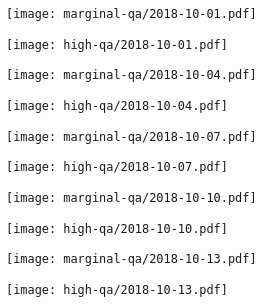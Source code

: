 \documentclass{article}
\begin{document}
\begin{figure}[H]
	\ContinuedFloat
	\centering
	\begin{subfigure}{0.48\linewidth}
		\texttt{[image: marginal-qa/2018-10-01.pdf]}
	\end{subfigure}
	\begin{subfigure}{0.48\linewidth}
		\texttt{[image: high-qa/2018-10-01.pdf]}
	\end{subfigure}
	\begin{subfigure}{0.48\linewidth}
		\texttt{[image: marginal-qa/2018-10-04.pdf]}
	\end{subfigure}
	\begin{subfigure}{0.48\linewidth}
		\texttt{[image: high-qa/2018-10-04.pdf]}
	\end{subfigure}
	\begin{subfigure}{0.48\linewidth}
		\texttt{[image: marginal-qa/2018-10-07.pdf]}
	\end{subfigure}
	\begin{subfigure}{0.48\linewidth}
		\texttt{[image: high-qa/2018-10-07.pdf]}
	\end{subfigure}
	\begin{subfigure}{0.48\linewidth}
		\texttt{[image: marginal-qa/2018-10-10.pdf]}
	\end{subfigure}
	\begin{subfigure}{0.48\linewidth}
		\texttt{[image: high-qa/2018-10-10.pdf]}
	\end{subfigure}
	\begin{subfigure}{0.48\linewidth}
		\texttt{[image: marginal-qa/2018-10-13.pdf]}
	\end{subfigure}
	\begin{subfigure}{0.48\linewidth}
		\texttt{[image: high-qa/2018-10-13.pdf]}
	\end{subfigure}
\end{figure}
\end{document}
